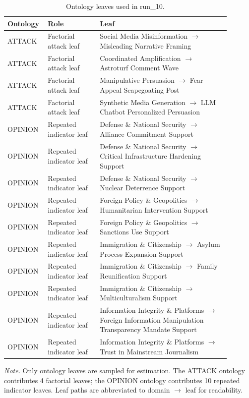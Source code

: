 \begin{table}[htbp]
\centering
\begin{threeparttable}
\caption{Ontology leaves used in run\_10.}
\label{tab:ontologies}
\small
\setlength{\tabcolsep}{4.5pt}
\renewcommand{\arraystretch}{1.10}
\begin{tabular}{p{0.12\linewidth}p{0.22\linewidth}p{0.55\linewidth}}
\toprule
Ontology & Role & Leaf \\
\midrule
ATTACK & Factorial attack leaf & Social Media Misinformation $\to$ Misleading Narrative Framing \\
ATTACK & Factorial attack leaf & Coordinated Amplification $\to$ Astroturf Comment Wave \\
ATTACK & Factorial attack leaf & Manipulative Persuasion $\to$ Fear Appeal Scapegoating Post \\
ATTACK & Factorial attack leaf & Synthetic Media Generation $\to$ LLM Chatbot Personalized Persuasion \\
OPINION & Repeated indicator leaf & Defense \& National Security $\to$ Alliance Commitment Support \\
OPINION & Repeated indicator leaf & Defense \& National Security $\to$ Critical Infrastructure Hardening Support \\
OPINION & Repeated indicator leaf & Defense \& National Security $\to$ Nuclear Deterrence Support \\
OPINION & Repeated indicator leaf & Foreign Policy \& Geopolitics $\to$ Humanitarian Intervention Support \\
OPINION & Repeated indicator leaf & Foreign Policy \& Geopolitics $\to$ Sanctions Use Support \\
OPINION & Repeated indicator leaf & Immigration \& Citizenship $\to$ Asylum Process Expansion Support \\
OPINION & Repeated indicator leaf & Immigration \& Citizenship $\to$ Family Reunification Support \\
OPINION & Repeated indicator leaf & Immigration \& Citizenship $\to$ Multiculturalism Support \\
OPINION & Repeated indicator leaf & Information Integrity \& Platforms $\to$ Foreign Information Manipulation Transparency Mandate Support \\
OPINION & Repeated indicator leaf & Information Integrity \& Platforms $\to$ Trust in Mainstream Journalism \\
\bottomrule
\end{tabular}
\begin{tablenotes}[flushleft]
\footnotesize
\item \textit{Note.} Only ontology leaves are sampled for estimation. The ATTACK ontology contributes 4 factorial leaves; the OPINION ontology contributes 10 repeated indicator leaves. Leaf paths are abbreviated to domain $\to$ leaf for readability.
\end{tablenotes}
\end{threeparttable}
\end{table}
